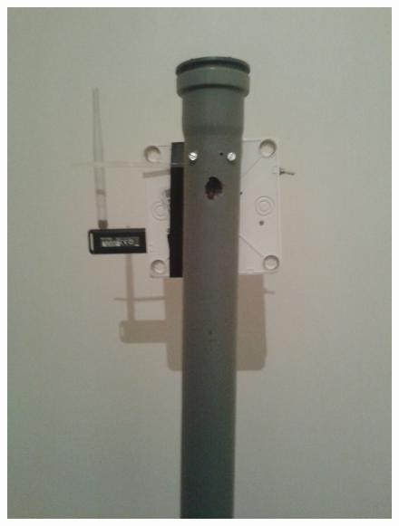 \documentclass[11pt,a4paper, twoside]{article}
\begin{document}
\begin{figure}[H]
\begin{center}
\includegraphics[scale=0.06]{./img/start-front.jpg}

\end{center}
\end{figure}
\end{document}
